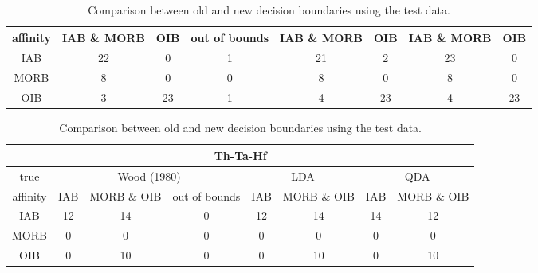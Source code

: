 \begin{table}[htbp]
\begin{tabular}{c|ccc|cc|cc}
affinity  & IAB \& MORB &  OIB & out of bounds & IAB \& MORB &  OIB & IAB \& MORB &  OIB \\
\hline
 IAB & 22 &  0 &  1 & 21 &  2 & 23 &  0 \\
  MORB &  8 &  0 &  0 &  8 &  0 &  8 &  0 \\
 OIB &  3 & 23 &  1 &  4 & 23 &  4 & 23 \\
\hline
\end{tabular}
\begin{tabular}{c|ccc|cc|cc}
\hline
\multicolumn{ 8}{c}{Th-Ta-Hf} \\
\hline
true &  \multicolumn{ 3}{c}{Wood (1980)} & \multicolumn{ 2}{|c}{LDA} & \multicolumn{ 2}{|c}{QDA} \\
affinity &  IAB & MORB \& OIB & out of bounds &  IAB & MORB \& OIB &  IAB & MORB \& OIB \\
\hline
 IAB & 12 & 14 &  0 & 12 & 14 & 14 & 12 \\
  MORB &  0 &  0 &  0 &  0 &  0 &  0 &  0 \\
 OIB &  0 & 10  & 0 &  0 & 10  & 0 & 10 \\ 
\hline
\end{tabular}
\caption[Comparison between the old and  new decision boundaries]
{Comparison  between old and  new decision  boundaries using  the test
data.}
\label{tab:comparison} 
\end{table}
